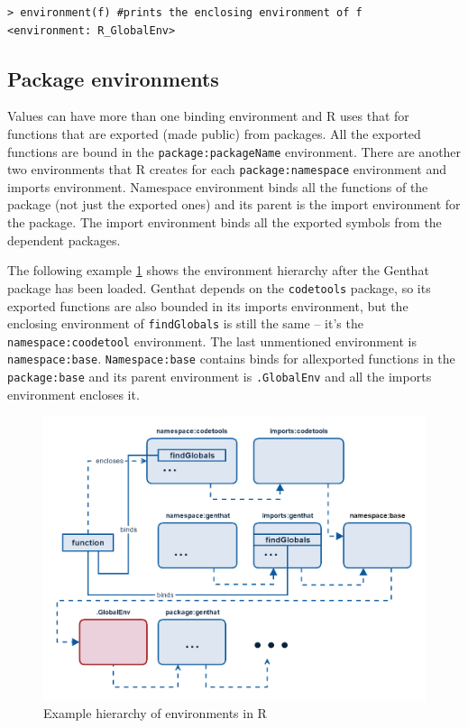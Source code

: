 \documentclass[thesis=B,english]{FITthesis}[2012/10/20]
\begin{document}
\begin{verbatim}
> environment(f) #prints the enclosing environment of f
<environment: R_GlobalEnv>
\end{verbatim}

\subsection{Package environments}

Values can have more than one binding environment and R uses that for functions that are exported (made public) from packages. All the exported functions are bound in the \verb|package:packageName| environment. There are another two environments that R creates for each \verb|package:namespace| environment and imports environment. Namespace environment binds all the functions of the package (not just the exported ones) and its parent is the import environment for the package. The import environment binds all the exported symbols from the dependent packages.

The following example \ref{fig:hierarchy} shows the environment hierarchy after the Genthat package has been loaded. Genthat depends on the \texttt{codetools} package\cite{codetools}, so its exported functions are also bounded in its imports environment, but the enclosing environment of \texttt{findGlobals} is still the same – it’s the \texttt{namespace:coodetool} environment. The last unmentioned environment is \texttt{namespace:base}. \texttt{Namespace:base} contains binds for allexported functions in the \texttt{package:base} and its parent environment is \texttt{.GlobalEnv} and all the imports environment encloses it.

\begin{figure}\centering
    \includegraphics[width=\textwidth]{img/hierarchy.png}
	\caption[Example hierarchy of environments in R]{Example hierarchy of environments in R}\label{fig:hierarchy}
\end{figure}
\end{document}
